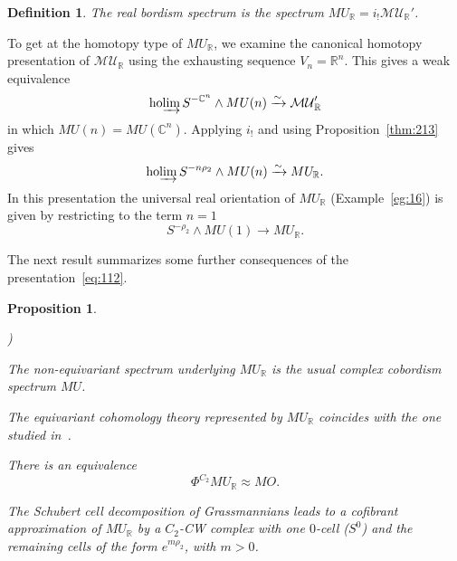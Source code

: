 \documentclass{amsart}
\newtheorem{prop}[equation]{Proposition}
\newtheorem{definition}[equation]{Definition}
\newenvironment{defin}{\begin{definition}\rm}{\end{definition}}
\theoremstyle{definition}
\newtheorem{defin}[equation]{Definition}
\theoremstyle{remark}
\newcommand{\R}{{\mathbb R}}
\newcommand{\C}{\mathbb C}
\newcounter{thmItem}
\newenvironment{thmList}{\begin{list}%
{\rm \roman{thmItem})}{\usecounter{thmItem}
\setlength{\labelwidth}{2em}
\setlength{\itemindent}{2em}
\setlength{\leftmargin}{0pt}
\setlength{\listparindent}{0pt}
\setlength{\parsep}{0pt}
\setlength{\partopsep}{0pt}
\setlength{\itemsep}{\medskipamount}
\setlength{\topsep}{\medskipamount}
}}{\end{list}}
\newcommand{\mur}{MU_{\R}}
\newcommand{\MUR}{\mathcal{MU}_{\R}}
\DeclareMathOperator{\ho}{ho}
\newcommand{\hocolim}{\ho\!\varinjlim}
\newcommand{\zt}{C_{2}}
\begin{document}
\begin{defin}
\label{def:53}
The {\em real bordism spectrum} is the spectrum $\mur = i_{!}\MUR'$.
\end{defin}

To get at the homotopy type of $\mur$, we examine the canonical
homotopy presentation of $\MUR$ using the exhausting sequence
$V_{n}=\R^{n}$.  This gives a weak equivalence
\begin{equation}
\label{eq:112}
\hocolim S^{-\C^{n}}\wedge MU(n) \xrightarrow{\sim}\MUR'
\end{equation}
in which $MU(n)=MU(\C^{n})$.  Applying $i_{!}$ and using
Proposition~\ref{thm:213} gives 
\[
\hocolim S^{-n\rho_{2}}\wedge MU(n) \xrightarrow{\sim}\mur.
\]
In this presentation the universal real orientation of $\mur$
(Example~\ref{eg:16}) is given by restricting to the term $n=1$
\[
S^{-\rho_{2}}\wedge MU(1) \to \mur.
\]

The next result summarizes some further consequences of the presentation~\eqref{eq:112}.

\begin{prop}
\begin{thmList}
\item The non-equivariant spectrum underlying $\mur$ is the usual
complex cobordism spectrum $MU$.  
\item The equivariant cohomology theory represented by $\mur$
coincides with the one studied
in~\cite{MR0222890,MR0420597,MR614829,MR1808224}.
\item There is an equivalence 
\[
\Phi^{\zt}\mur \approx MO.
\]
\item The Schubert cell decomposition of Grassmannians leads to a
cofibrant approximation of $\mur$ by a $\zt$-CW complex with one
$0$-cell ($S^{0}$) and the remaining cells of the form
$e^{m\rho_{2}}$, with $m>0$.
\end{thmList}
\end{prop}

%
\end{document}
